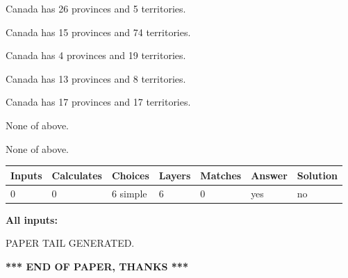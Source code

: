 \documentclass[12pt]{article}
\begin{document}
 
Canada has  26 provinces and  5 territories.
 
 
Canada has  15 provinces and  74 territories.
 
 
Canada has   4 provinces and  19 territories.
 
 
Canada has  13 provinces and  8 territories.
 
 
Canada has  17 provinces and  17 territories.
 
 
 None of above.
 
 
\noindent{}
 
 
 None of above.
 
 
\noindent{}
 
 
   
   
   
   
\noindent\begin{tabular}{|l|l|l|l|l|l|l|}
 \hline
Inputs & Calculates & Choices & Layers & Matches & Answer & Solution \\ \hline
 0  & 
 0  & 
 6
  simple  
  & 
 6  & 
 0  & 
  yes & 
  no 
  \\ \hline
 \end{tabular}
   
   
   
   
\noindent{}
   
   
   
   
\noindent\vspace{0.1in}\hspace{-0.08in} {\textbf{\Large{All inputs: }}}
   
   
   
   
   
   
 \vspace{0.2in}
 
   
   
\vspace{2.0in} PAPER TAIL GENERATED.
   
   
   
   
\vspace{1.0in} 
{\textbf{\large{ *** END OF PAPER, THANKS *** }}} 
   
\end{document}
